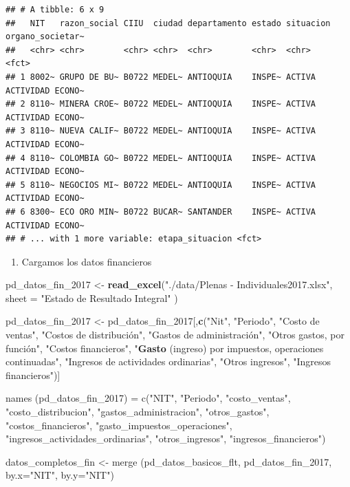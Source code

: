 \documentclass[
  11pt,
]{article}
\newenvironment{Shaded}{\begin{snugshade}}{\end{snugshade}}
\newcommand{\DataTypeTok}[1]{\textcolor[rgb]{0.13,0.29,0.53}{#1}}
\newcommand{\DecValTok}[1]{\textcolor[rgb]{0.00,0.00,0.81}{#1}}
\newcommand{\KeywordTok}[1]{\textcolor[rgb]{0.13,0.29,0.53}{\textbf{#1}}}
\newcommand{\NormalTok}[1]{#1}
\newcommand{\StringTok}[1]{\textcolor[rgb]{0.31,0.60,0.02}{#1}}
\providecommand{\tightlist}{%
  \setlength{\itemsep}{0pt}\setlength{\parskip}{0pt}}
\begin{document}
\begin{verbatim}
## # A tibble: 6 x 9
##   NIT   razon_social CIIU  ciudad departamento estado situacion organo_societar~
##   <chr> <chr>        <chr> <chr>  <chr>        <chr>  <chr>     <fct>           
## 1 8002~ GRUPO DE BU~ B0722 MEDEL~ ANTIOQUIA    INSPE~ ACTIVA    ACTIVIDAD ECONO~
## 2 8110~ MINERA CROE~ B0722 MEDEL~ ANTIOQUIA    INSPE~ ACTIVA    ACTIVIDAD ECONO~
## 3 8110~ NUEVA CALIF~ B0722 MEDEL~ ANTIOQUIA    INSPE~ ACTIVA    ACTIVIDAD ECONO~
## 4 8110~ COLOMBIA GO~ B0722 MEDEL~ ANTIOQUIA    INSPE~ ACTIVA    ACTIVIDAD ECONO~
## 5 8110~ NEGOCIOS MI~ B0722 MEDEL~ ANTIOQUIA    INSPE~ ACTIVA    ACTIVIDAD ECONO~
## 6 8300~ ECO ORO MIN~ B0722 BUCAR~ SANTANDER    INSPE~ ACTIVA    ACTIVIDAD ECONO~
## # ... with 1 more variable: etapa_situacion <fct>
\end{verbatim}

\begin{enumerate}
\def\labelenumi{\arabic{enumi}.}
\setcounter{enumi}{2}
\tightlist
\item
  Cargamos los datos financieros
\end{enumerate}

\begin{Shaded}
\begin{Highlighting}[]
\NormalTok{pd_datos_fin_}\DecValTok{2017}\NormalTok{ <-}\StringTok{ }\KeywordTok{read_excel}\NormalTok{(}\StringTok{"./data/Plenas - Individuales2017.xlsx"}\NormalTok{, }\DataTypeTok{sheet =} \StringTok{"Estado de Resultado Integral"}\NormalTok{ )}

\NormalTok{pd_datos_fin_}\DecValTok{2017}\NormalTok{ <-}\StringTok{ }\NormalTok{pd_datos_fin_}\DecValTok{2017}\NormalTok{[,}\KeywordTok{c}\NormalTok{(}\StringTok{"Nit"}\NormalTok{, }\StringTok{"Periodo"}\NormalTok{, }\StringTok{"Costo de ventas"}\NormalTok{,  }\StringTok{"Costos de distribución", "}\NormalTok{Gastos de administración", }\StringTok{"Otros gastos, por función", "}\NormalTok{Costos financieros}\StringTok{", "}\KeywordTok{Gasto}\NormalTok{ (ingreso) por impuestos, operaciones continuadas}\StringTok{", "}\NormalTok{Ingresos de actividades ordinarias}\StringTok{", "}\NormalTok{Otros ingresos}\StringTok{", "}\NormalTok{Ingresos financieros}\StringTok{")]}

\StringTok{names (pd_datos_fin_2017) = c("}\NormalTok{NIT}\StringTok{", "}\NormalTok{Periodo}\StringTok{", "}\NormalTok{costo_ventas}\StringTok{",  "}\NormalTok{costo_distribucion}\StringTok{", "}\NormalTok{gastos_administracion}\StringTok{", "}\NormalTok{otros_gastos}\StringTok{", "}\NormalTok{costos_financieros}\StringTok{", "}\NormalTok{gasto_impuestos_operaciones}\StringTok{", "}\NormalTok{ingresos_actividades_ordinarias}\StringTok{", "}\NormalTok{otros_ingresos}\StringTok{", "}\NormalTok{ingresos_financieros}\StringTok{")}


\StringTok{datos_completos_fin <- merge (pd_datos_basicos_flt, pd_datos_fin_2017, by.x="}\NormalTok{NIT}\StringTok{", by.y="}\NormalTok{NIT}\StringTok{")}
\end{Highlighting}
\end{Shaded}
\end{document}
